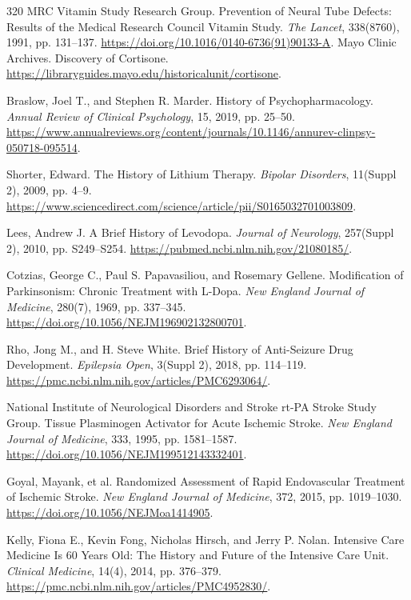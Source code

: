 \documentclass[12pt,oneside]{book}
\begin{document}
\begin{thebibliography}{320}
MRC Vitamin Study Research Group. Prevention of Neural Tube Defects: Results
of the Medical Research Council Vitamin Study. \emph{The Lancet}, 338(8760),
1991, pp. 131--137.
\url{https://doi.org/10.1016/0140-6736(91)90133-A}.
Mayo Clinic Archives. Discovery of Cortisone.
\url{https://libraryguides.mayo.edu/historicalunit/cortisone}.

Braslow, Joel T., and Stephen R. Marder. History of Psychopharmacology.
\emph{Annual Review of Clinical Psychology}, 15, 2019, pp. 25--50.
\url{https://www.annualreviews.org/content/journals/10.1146/annurev-clinpsy-050718-095514}.

Shorter, Edward. The History of Lithium Therapy.
\emph{Bipolar Disorders}, 11(Suppl 2), 2009, pp. 4--9.
\url{https://www.sciencedirect.com/science/article/pii/S0165032701003809}.

Lees, Andrew J. A Brief History of Levodopa.
\emph{Journal of Neurology}, 257(Suppl 2), 2010, pp. S249--S254.
\url{https://pubmed.ncbi.nlm.nih.gov/21080185/}.

Cotzias, George C., Paul S. Papavasiliou, and Rosemary Gellene.
Modification of Parkinsonism: Chronic Treatment with L-Dopa.
\emph{New England Journal of Medicine}, 280(7), 1969, pp. 337--345.
\url{https://doi.org/10.1056/NEJM196902132800701}.

Rho, Jong M., and H. Steve White. Brief History of Anti-Seizure Drug
Development. \emph{Epilepsia Open}, 3(Suppl 2), 2018, pp. 114--119.
\url{https://pmc.ncbi.nlm.nih.gov/articles/PMC6293064/}.

National Institute of Neurological Disorders and Stroke rt-PA Stroke Study
Group. Tissue Plasminogen Activator for Acute Ischemic Stroke.
\emph{New England Journal of Medicine}, 333, 1995, pp. 1581--1587.
\url{https://doi.org/10.1056/NEJM199512143332401}.

Goyal, Mayank, et al. Randomized Assessment of Rapid Endovascular Treatment
of Ischemic Stroke. \emph{New England Journal of Medicine}, 372, 2015,
pp. 1019--1030.
\url{https://doi.org/10.1056/NEJMoa1414905}.

Kelly, Fiona E., Kevin Fong, Nicholas Hirsch, and Jerry P. Nolan. Intensive
Care Medicine Is 60 Years Old: The History and Future of the Intensive Care
Unit. \emph{Clinical Medicine}, 14(4), 2014, pp. 376--379.
\url{https://pmc.ncbi.nlm.nih.gov/articles/PMC4952830/}.


\end{thebibliography}
\end{document}
